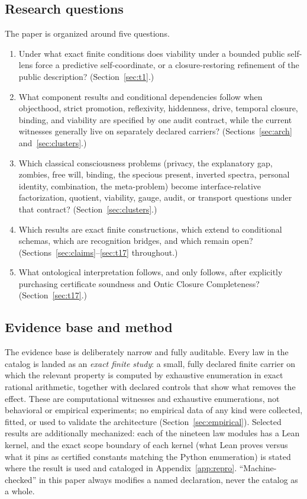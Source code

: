 \documentclass[11pt]{article}
\theoremstyle{definition}
\begin{document}
\subsection{Research questions}
\label{sec:questions}

The paper is organized around five questions.

\begin{enumerate}
\item Under what exact finite conditions does viability under a bounded public
self-lens force a predictive self-coordinate, or a closure-restoring refinement
of the public description? (Section~\ref{sec:t1}.)
\item What component results and conditional dependencies follow when
objecthood, strict promotion, reflexivity, hiddenness, drive, temporal closure,
binding, and viability are specified by one audit contract, while the
current witnesses generally live on separately declared carriers?
(Sections~\ref{sec:arch} and~\ref{sec:clusters}.)
\item Which classical consciousness problems (privacy, the explanatory gap,
zombies, free will, binding, the specious present, inverted spectra, personal
identity, combination, the meta-problem) become interface-relative
factorization, quotient, viability, gauge, audit, or transport questions under
that contract? (Section~\ref{sec:clusters}.)
\item Which results are exact finite constructions, which extend to conditional
schemas, which are recognition bridges, and which remain open?
(Sections~\ref{sec:claims}--\ref{sec:t17} throughout.)
\item What ontological interpretation follows, and only follows, after
explicitly purchasing certificate soundness and Ontic Closure Completeness?
(Section~\ref{sec:t17}.)
\end{enumerate}

\subsection{Evidence base and method}

The evidence base is deliberately narrow and fully auditable. Every law in the
catalog is landed as an \emph{exact finite study}: a small, fully declared
finite carrier on which the relevant property is computed by exhaustive
enumeration in exact rational arithmetic, together with declared controls that
show what removes the effect. These are computational witnesses and exhaustive
enumerations, not behavioral or empirical experiments; no empirical data of any
kind were collected, fitted, or used to validate the architecture
(Section~\ref{sec:empirical}). Selected results are additionally mechanized:
each of the nineteen law modules has a Lean kernel, and the exact scope
boundary of each kernel (what Lean proves versus what it pins as certified
constants matching the Python enumeration) is stated where the result is used
and cataloged in Appendix~\ref{app:repro}. ``Machine-checked'' in this paper always
modifies a named declaration, never the catalog as a whole.
\end{document}
